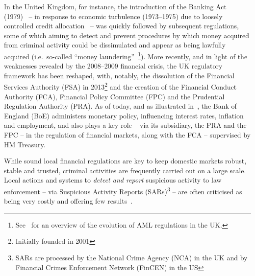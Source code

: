 \documentclass[runningheads,10pt]{llncs}
\numberwithin{equation}{section}
\begin{document}

In the United Kingdom, for instance, the introduction of the Banking Act
(1979)~\cite{1979-uk-dev} -- in response to economic turbulence (1973--1975) due
to loosely controlled credit
allocation~\cite{Chapter10RegulatoryandOtherChangesintheUKBankingMarket} -- was
quickly followed by subsequent regulations, some of which aiming to detect and
prevent procedures by which money acquired from criminal activity could be
dissimulated and appear as being lawfully acquired (i.e.~so-called ``money
laundering''~\cite{si-1993-1933,2001-c-24,si-2003-3075}\footnote{See~\cite{ML-law}
for an overview of the evolution of AML regulations in the UK.}).  More
recently, and in light of the weaknesses revealed by the 2008--2009 financial
crisis, the UK regulatory framework has been reshaped, with, notably, the
dissolution of the Financial Services Authority (FSA) in
2013\footnote{Initially founded in 2001} and the creation of the Financial
Conduct Authority (FCA), Financial Policy Committee (FPC) and the Prudential
Regulation Authority (PRA). As of today, and as illustrated in~\cite[Chapter
1]{journey-to-fca}, the Bank of England (BoE) administers monetary policy,
influencing interest rates, inflation and employment, and also plays a key role
-- via its subsidiary, the PRA and the FPC -- in the regulation of financial
markets, along with the FCA -- supervised by HM Treasury.

While sound local financial regulations are key to keep domestic markets robust,
stable and trusted, criminal activities are frequently carried out on a large
scale. Local actions and systems to \emph{detect and report} suspicious activity to
law enforcement -- via Suspicious Activity Reports (SARs)\footnote{SARs are processed
  by the National Crime Agency (NCA) in the UK\cite{nca-sars,intro-to-sars} and by
  Financial Crimes Enforcement Network (FinCEN) in the US} -- are often criticised as
being very costly and offering few results~\cite{ML-law}.  
\end{document}
